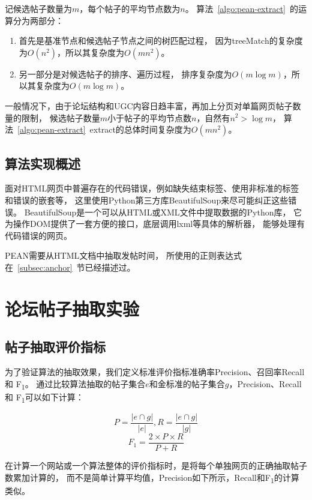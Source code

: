 记候选帖子数量为$m$，每个帖子的平均节点数为$n$。
算法~\ref{algo:pean-extract}~的运算分为两部分：
\begin{enumerate}
\item 首先是基准节点和候选帖子节点之间的树匹配过程，
因为treeMatch的复杂度为$O(n^2)$，所以其复杂度为$O(mn^2)$。
\item 另一部分是对候选帖子的排序、遍历过程，
排序复杂度为$O(m\log m)$，所以其复杂度为$O(m\log m)$。
\end{enumerate}

一般情况下，由于论坛结构和UGC内容日趋丰富，再加上分页对单篇网页帖子数量的限制，
候选帖子数量$m$小于帖子的平均节点数$n$，自然有$n^2 > \log m$，
算法~\ref{algo:pean-extract}~extract的总体时间复杂度为$O(mn^2)$。

\subsection{算法实现概述}
面对HTML网页中普遍存在的代码错误，例如缺失结束标签、使用非标准的标签和错误的嵌套等，
这里使用Python第三方库BeautifulSoup来尽可能纠正这些错误。
BeautifulSoup是一个可以从HTML或XML文件中提取数据的Python库，
它为操作DOM提供了一套方便的接口，底层调用lxml等具体的解析器，
能够处理有代码错误的网页。

PEAN需要从HTML文档中抽取发帖时间，
所使用的正则表达式在~\ref{subsec:anchor}~节已经描述过。


\section{论坛帖子抽取实验}
\label{sec:pean-experiment}

\subsection{帖子抽取评价指标}
为了验证算法的抽取效果，我们定义标准评价指标准确率Precision、召回率Recall和
F\textsubscript{1}。
通过比较算法抽取的帖子集合$e$和金标准的帖子集合$g$，Precision、Recall和
F\textsubscript{1}可以如下计算：

\begin{equation}
P = \frac{\vert e \cap g \vert}{\vert e \vert}, 
R = \frac{\vert e \cap g \vert}{\vert g \vert}
\end{equation}
\begin{equation}
F_1 = \frac{2 \times P \times R}{P + R}
\end{equation}

在计算一个网站或一个算法整体的评价指标时，是将每个单独网页的正确抽取帖子数累加计算的，
而不是简单计算平均值，Precision如下所示，Recall和F\textsubscript{1}的计算类似。

